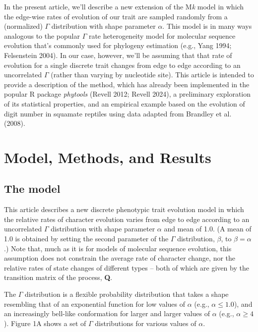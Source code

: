 \documentclass[fleqn,10pt,lineno]{wlpeerj} %
\begin{document}
In the present article, we'll describe a new extension of the M\emph{k} model in which the edge-wise rates of evolution of our trait are sampled randomly from a (normalized) \(\Gamma\) distribution with shape parameter \(\alpha\). This model is in many ways analogous to the popular \(\Gamma\) rate heterogeneity model for molecular sequence evolution that's commonly used for phylogeny estimation (e.g., Yang 1994; Felsenstein 2004). In our case, however, we'll be assuming that that rate of evolution for a single discrete trait changes from edge to edge according to an uncorrelated \(\Gamma\) (rather than varying by nucleotide site). This article is intended to provide a description of the method, which has already been implemented in the popular R package \emph{phytools} (Revell 2012; Revell 2024), a preliminary exploration of its statistical properties, and an empirical example based on the evolution of digit number in squamate reptiles using data adapted from Brandley et al. (2008).

\section{Model, Methods, and Results}\label{model-methods-and-results}

\subsection{The model}\label{the-model}

This article describes a new discrete phenotypic trait evolution model in which the relative rates of character evolution varies from edge to edge according to an uncorrelated \(\Gamma\) distribution with shape parameter \(\alpha\) and mean of 1.0. (A mean of 1.0 is obtained by setting the second parameter of the \(\Gamma\) distribution, \(\beta\), to \(\beta = \alpha\).) Note that, much as it is for models of molecular sequence evolution, this assumption does not constrain the average rate of character change, nor the relative rates of state changes of different types -- both of which are given by the transition matrix of the process, \textbf{Q}.

The \(\Gamma\) distribution is a flexible probability distribution that takes a shape resembling that of an exponential function for low values of \(\alpha\) (e.g., \(\alpha \le 1.0\)), and an increasingly bell-like conformation for larger and larger values of \(\alpha\) (e.g., \(\alpha \ge 4\)). Figure 1A shows a set of \(\Gamma\) distributions for various values of \(\alpha\).
\end{document}
